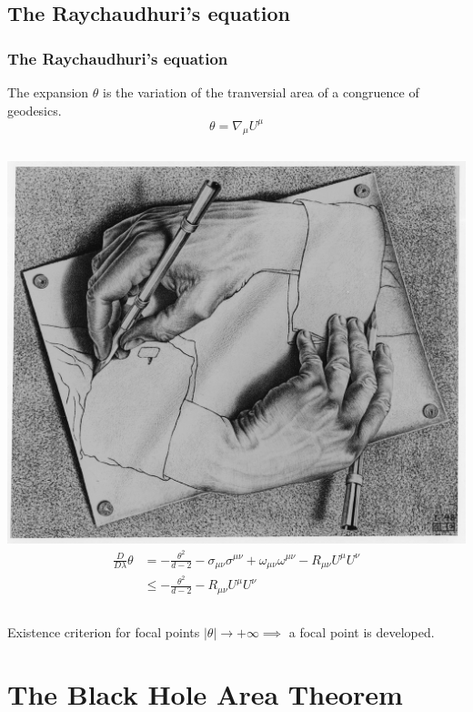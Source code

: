 \documentclass[handout]{beamer}
\begin{document}
	\subsection{The Raychaudhuri's equation}
	\begin{frame}
		\frametitle{The Raychaudhuri's equation}
		\begin{defblock}{The expansion}
			\(\theta\) is the variation of the tranversial area of a congruence of geodesics.
			\[
			\theta = \nabla_{\mu}U^{\mu}	
			\]
		\end{defblock}
		\vskip 10pt
		\begin{columns}
			\centering
				\includegraphics[scale=0.1]{Immagini/escher.jpg}
			\begin{align*}
				\frac{D}{D\lambda}\theta &= -\frac{\theta^2}{d - 2} - \sigma_{\mu\nu}\sigma^{\mu\nu} + \omega_{\mu\nu}\omega^{\mu\nu}  - R_{\mu\nu}U^{\mu}U^{\nu} \\
				&\le -\frac{\theta^2}{d - 2} - R_{\mu\nu}U^{\mu}U^{\nu}
			\end{align*}
		\end{columns}
		\vskip 10pt
		\begin{ideablock}{Existence criterion for focal points}
			\centering
			\(\vert\theta\vert \rightarrow +\infty \implies \) 
			a focal point is developed.
		\end{ideablock}
	\end{frame}

	\section{The Black Hole Area Theorem}
\end{document}
